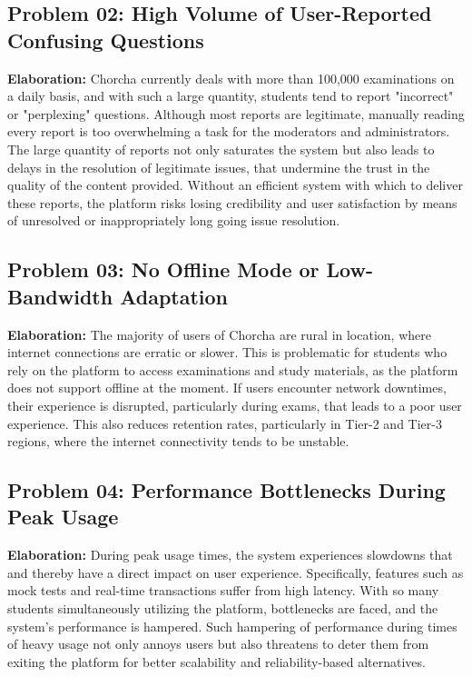 \documentclass[12pt,a4paper,oneside]{book}
\begin{document}
\subsection{Problem 02: High Volume of User-Reported Confusing Questions}
\textbf{Elaboration:} Chorcha currently deals with more than 100,000 examinations on a daily basis, and with such a large quantity, students tend to report "incorrect" or "perplexing" questions. Although most reports are legitimate, manually reading every report is too overwhelming a task for the moderators and administrators. The large quantity of reports not only saturates the system but also leads to delays in the resolution of legitimate issues, that undermine the trust in the quality of the content provided. Without an efficient system with which to deliver these reports, the platform risks losing credibility and user satisfaction by means of unresolved or inappropriately long going issue resolution.

\subsection{Problem 03: No Offline Mode or Low-Bandwidth Adaptation}
\textbf{Elaboration:} The majority of users of Chorcha are rural in location, where internet connections are erratic or slower. This is problematic for students who rely on the platform to access examinations and study materials, as the platform does not support offline at the moment. If users encounter network downtimes, their experience is disrupted, particularly during exams, that leads to a poor user experience. This also reduces retention rates, particularly in Tier-2 and Tier-3 regions, where the internet connectivity tends to be unstable.

\subsection{Problem 04: Performance Bottlenecks During Peak Usage}
\textbf{Elaboration:} During peak usage times, the system experiences slowdowns that and thereby have a direct impact on user experience. Specifically, features such as mock tests and real-time transactions suffer from high latency. With so many students simultaneously utilizing the platform, bottlenecks are faced, and the system's performance is hampered. Such hampering of performance during times of heavy usage not only annoys users but also threatens to deter them from exiting the platform for better scalability and reliability-based alternatives.
\end{document}

